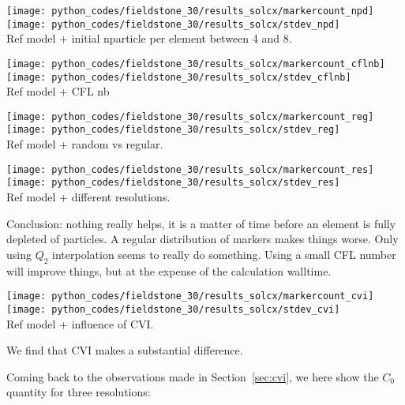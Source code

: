 \begin{center}
\texttt{[image: python\_codes/fieldstone\_30/results\_solcx/markercount\_npd]}
\texttt{[image: python\_codes/fieldstone\_30/results\_solcx/stdev\_npd]}\\
{\captionfont Ref model + initial nparticle per element between 4 and 8.}
\end{center}

\begin{center}
\texttt{[image: python\_codes/fieldstone\_30/results\_solcx/markercount\_cflnb]}
\texttt{[image: python\_codes/fieldstone\_30/results\_solcx/stdev\_cflnb]}\\
{\captionfont Ref model + CFL nb}
\end{center}

\begin{center}
\texttt{[image: python\_codes/fieldstone\_30/results\_solcx/markercount\_reg]}
\texttt{[image: python\_codes/fieldstone\_30/results\_solcx/stdev\_reg]}\\
{\captionfont Ref model + random vs regular.} 
\end{center}

\begin{center}
\texttt{[image: python\_codes/fieldstone\_30/results\_solcx/markercount\_res]}
\texttt{[image: python\_codes/fieldstone\_30/results\_solcx/stdev\_res]}\\
{\captionfont Ref model + different resolutions.}
\end{center}

Conclusion: nothing really helps, it is a matter of time before an element is fully depleted of particles. 
A regular distribution of markers makes things worse. Only using $Q_2$ interpolation seems to really do 
something. Using a small CFL number will improve things, but at the expense of the calculation walltime. 


\begin{center}
\texttt{[image: python\_codes/fieldstone\_30/results\_solcx/markercount\_cvi]}
\texttt{[image: python\_codes/fieldstone\_30/results\_solcx/stdev\_cvi]}\\
{\captionfont Ref model + influence of CVI.} 
\end{center}

We find that CVI makes a substantial difference. 


Coming back to the observations made in Section~\ref{sec:cvi}, 
we here show the $C_0$ quantity for three resolutions:

